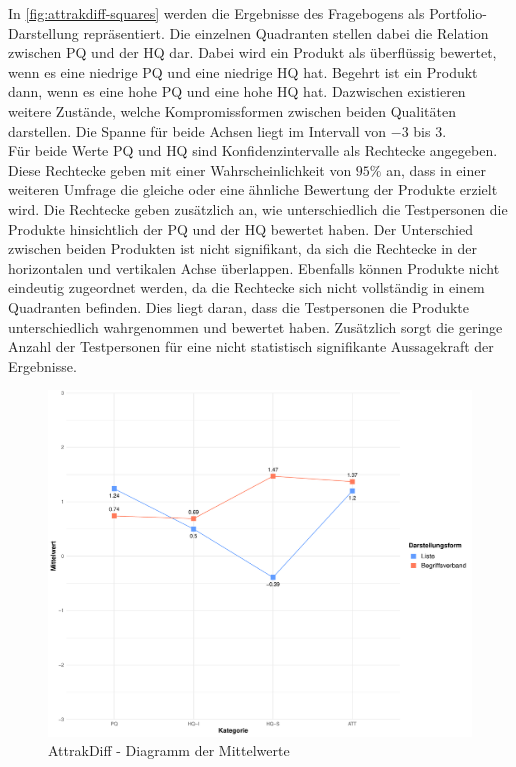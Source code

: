In \autoref{fig:attrakdiff-squares} werden die Ergebnisse des Fragebogens als Portfolio-Darstellung repräsentiert.
Die einzelnen Quadranten stellen dabei die Relation zwischen \ac{PQ} und der \ac{HQ} dar.
Dabei wird ein Produkt als überflüssig bewertet, wenn es eine niedrige \ac{PQ} und eine niedrige \ac{HQ} hat.
Begehrt ist ein Produkt dann, wenn es eine hohe \ac{PQ} und eine hohe \ac{HQ} hat.
Dazwischen existieren weitere Zustände, welche Kompromissformen zwischen beiden Qualitäten darstellen.
Die Spanne für beide Achsen liegt im Intervall von $-3$ bis $3$. \\

Für beide Werte \ac{PQ} und \ac{HQ} sind Konfidenzintervalle als Rechtecke angegeben.
Diese Rechtecke geben mit einer Wahrscheinlichkeit von $95\%$ an, dass in einer weiteren Umfrage die gleiche oder eine ähnliche Bewertung der Produkte erzielt wird.
Die Rechtecke geben zusätzlich an, wie unterschiedlich die Testpersonen die Produkte hinsichtlich der \ac{PQ} und der \ac{HQ} bewertet haben.
Der Unterschied zwischen beiden Produkten ist nicht signifikant, da sich die Rechtecke in der horizontalen und vertikalen Achse überlappen.
Ebenfalls können Produkte nicht eindeutig zugeordnet werden, da die Rechtecke sich nicht vollständig in einem Quadranten befinden.
Dies liegt daran, dass die Testpersonen die Produkte unterschiedlich wahrgenommen und bewertet haben.
Zusätzlich sorgt die geringe Anzahl der Testpersonen für eine nicht statistisch signifikante Aussagekraft der Ergebnisse. \\

\begin{figure}[!ht]
    \centering
    \includegraphics[width=0.7\columnwidth]{figures/attrakdiff-line.pdf}
    \caption{\label{fig:attrakdiff-line}AttrakDiff - Diagramm der Mittelwerte}
\end{figure}

